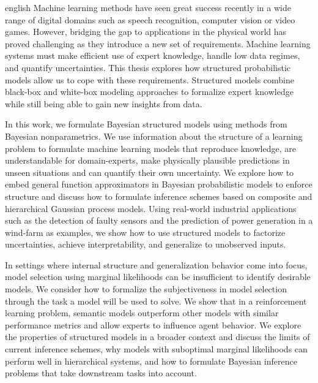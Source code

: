\begin{Abstract}{english}
    Machine learning methods have seen great success recently in a wide range of digital domains such as speech recognition, computer vision or video games.
    However, bridging the gap to applications in the physical world has proved challenging as they introduce a new set of requirements.
    Machine learning systems must make efficient use of expert knowledge, handle low data regimes, and quantify uncertainties.
    This thesis explores how structured probabilistic models allow us to cope with these requirements.
    Structured models combine black-box and white-box modeling approaches to formalize expert knowledge while still being able to gain new insights from data.

    In this work, we formulate Bayesian structured models using methods from Bayesian nonparametrics.
    We use information about the structure of a learning problem to formulate machine learning models that reproduce knowledge, are understandable for domain-experts, make physically plausible predictions in unseen situations and can quantify their own uncertainty.
    We explore how to embed general function approximators in Bayesian probabilistic models to enforce structure and discuss how to formulate inference schemes based on composite and hierarchical Gaussian process models.
    Using real-world industrial applications such as the detection of faulty sensors and the prediction of power generation in a wind-farm as examples, we show how to use structured models to factorize uncertainties, achieve interpretability, and generalize to unobserved inputs.

    In settings where internal structure and generalization behavior come into focus, model selection using marginal likelihoods can be insufficient to identify desirable models.
    We consider how to formalize the subjectiveness in model selection through the task a model will be used to solve.
    We show that in a reinforcement learning problem, semantic models outperform other models with similar performance metrics and allow experts to influence agent behavior.
    We explore the properties of structured models in a broader context and discuss the limits of current inference schemes, why models with suboptimal marginal likelihoods can perform well in hierarchical systems, and how to formulate Bayesian inference problems that take downstream tasks into account.
\end{Abstract}

